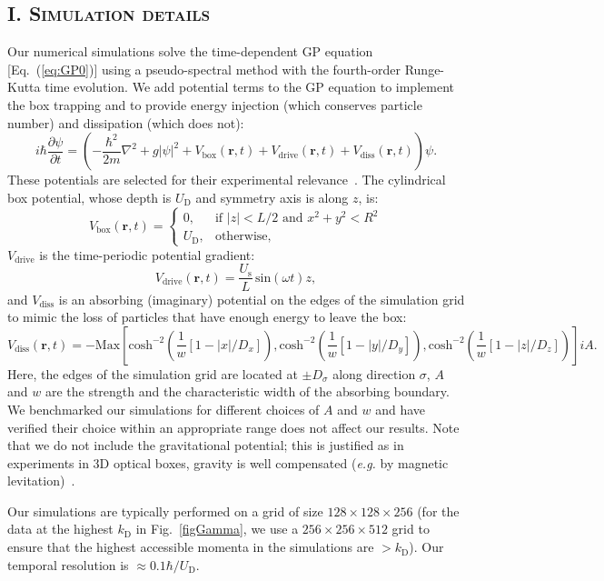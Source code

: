 \documentclass[prl,aps,twocolumn, a4paper,longbibliography,superscriptaddress]{revtex4-2}
\newcommand{\kD}{k_{\textrm{D}}}
\newcommand{\UD}{U_{\textrm{D}}}
\newcommand{\Us}{U_{\textrm{s}}}
\begin{document}
\subsection{\textsc{I. Simulation details}}
Our numerical simulations solve the time-dependent GP equation [Eq.~(\ref{eq:GP0})] using a pseudo-spectral method with the fourth-order Runge-Kutta time evolution. We add potential terms to the GP equation to implement the box trapping and to provide energy injection (which conserves particle number) and dissipation (which does not):
\begin{equation}
\label{eq:GP}
    i\hbar\frac{\partial \psi}{\partial t}=\left(-\frac{\hbar^2}{2m}\nabla^2+g|\psi|^2+V_\mathrm{box}(\boldsymbol{r},t)+V_\mathrm{drive}(\boldsymbol{r},t)+V_\mathrm{diss}(\boldsymbol{r},t)\right)\psi.
\end{equation}
These potentials are selected for their experimental relevance~\cite{Navon:2019,Dogra:2023}. The cylindrical box potential, whose depth is $\UD$ and symmetry axis is along $z$, is:
$$V_\mathrm{box}(\boldsymbol{r},t)=
\begin{cases}
    0, & \text{if } |z|<L/2 \text{ and } x^2+y^2<R^2\\
    \UD,              & \text{otherwise,}
\end{cases}$$
$V_\mathrm{drive}$ is the time-periodic potential gradient:
$$V_\mathrm{drive}(\boldsymbol{r},t)=\frac{\Us}{L}\,\textrm{sin}(\omega t)z,$$
and $V_\mathrm{diss}$ is an absorbing (imaginary) potential on the edges of the simulation grid to mimic the loss of particles that have enough energy to leave the box:
$$V_{\mathrm{diss}}(\boldsymbol{r},t)=-\textrm{Max}\left[\textrm{cosh} ^{-2}
\left( \frac{1}{w}[1-|x|/D_x]\right),
\textrm{cosh} ^{-2}
\left( \frac{1}{w}[1-|y|/D_y]\right),
\textrm{cosh} ^{-2}
\left( \frac{1}{w}[1-|z|/D_z]\right)
\right]iA.$$
Here, the edges of the simulation grid are located at $\pm D_\sigma$ along direction $\sigma$, $A$ and $w$ are the strength and the characteristic width of the absorbing boundary. We benchmarked our simulations for different choices of $A$ and $w$ and have verified their choice within an appropriate range does not affect our results. Note that we do not include the gravitational potential; this is justified as in experiments in 3D optical boxes, gravity is well compensated (\emph{e.g.} by magnetic levitation)~\cite{Navon:2021}.


Our simulations are typically performed on a grid of size $128\times128\times256$ (for the data at the highest $\kD$ in Fig.~\ref{figGamma}, we use a $256\times256\times512$ grid to ensure that the highest accessible momenta in the simulations are $>\kD$). Our temporal resolution is $\approx0.1\hbar/\UD$.
\end{document}
